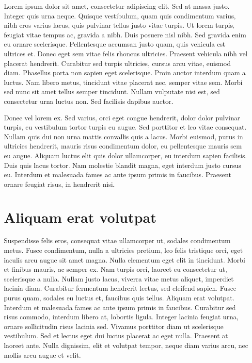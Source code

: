 \label{ch:background}

Lorem ipsum dolor sit amet, consectetur adipiscing elit. Sed at massa justo. Integer quis urna neque. Quisque vestibulum, quam quis condimentum varius, nibh eros varius lacus, quis pulvinar tellus justo vitae turpis. Ut lorem turpis, feugiat vitae tempus ac, gravida a nibh. Duis posuere nisl nibh. Sed gravida enim eu ornare scelerisque. Pellentesque accumsan justo quam, quis vehicula est ultrices et. Donec eget sem vitae felis rhoncus ultricies. Praesent vehicula nibh vel placerat hendrerit. Curabitur sed turpis ultricies, cursus arcu vitae, euismod diam. Phasellus porta non sapien eget scelerisque. Proin auctor interdum quam a luctus. Nam libero metus, tincidunt vitae placerat nec, semper vitae sem. Morbi sed nunc sit amet tellus semper tincidunt. Nullam vulputate nisi est, sed consectetur urna luctus non. Sed facilisis dapibus auctor.\cite{Holcomb2009}

Donec vel lorem ex. \gls{Sed} varius, orci eget congue hendrerit, dolor dolor pulvinar turpis, eu vestibulum tortor turpis eu augue. Sed porttitor et leo vitae consequat. Nullam quis dui non urna mattis convallis quis a lacus. Morbi euismod, purus in ultricies hendrerit, mauris risus condimentum dolor, eu pellentesque mauris sem eu augue. Aliquam luctus elit quis dolor ullamcorper, eu interdum sapien facilisis. Duis quis lacus tortor. Nam molestie blandit magna, eget interdum justo cursus eu. Interdum et malesuada fames ac ante ipsum primis in faucibus. Praesent ornare feugiat risus, in hendrerit nisi.

\section{Aliquam erat volutpat}
    Suspendisse felis eros, consequat vitae ullamcorper ut, sodales condimentum metus. Fusce condimentum, nulla a ultricies pretium, leo felis tristique orci, eget iaculis arcu augue sit amet magna. Nulla elementum eget elit in tincidunt. Morbi et finibus mauris, ac semper ex. Nam turpis orci, laoreet eu consectetur ut, \gls{scelerisque} a nulla. Nullam justo lacus, viverra vitae metus aliquet, imperdiet lacinia diam. Curabitur fermentum hendrerit lectus, sed eleifend sapien. Fusce purus quam, sodales eu luctus et, faucibus quis tellus. Aliquam erat volutpat. Interdum et malesuada fames ac ante ipsum primis in faucibus. Curabitur sed risus commodo, interdum libero at, lobortis ligula. Integer lacinia feugiat urna, ornare sollicitudin risus lacinia sed. Vivamus porttitor diam ut scelerisque vestibulum. Sed et lectus eget dui luctus placerat ac eget nulla. Praesent at laoreet ante. Nulla dignissim, elit et volutpat tempor, neque diam varius arcu, nec mollis arcu augue et velit.

